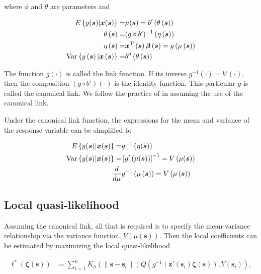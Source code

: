 \documentclass[12pt,english,authoryear, review]{article}\usepackage[]{graphicx}\usepackage[]{color}
\theoremstyle{plain}
\theoremstyle{plain}
\begin{document}
where $\phi$ and $\theta$ are parameters and

\begin{align*}
E\left\{ y(\bm{s})|\bm{x}(\bm{s})\right\} = & \mu(\bm{s})=b'\left(\theta\left(\bm{s}\right)\right)\\
\theta\left(\bm{s}\right)= & (g\circ b')^{-1}\left(\eta\left(\bm{s}\right)\right)\\
\eta\left(\bm{s}\right)= & \bm{x}^{T}\left(\bm{s}\right)\bm{\beta}\left(\bm{s}\right)=g\left(\mu\left(\bm{s}\right)\right)\\
\text{\text{Var}}\left\{ y\left(\bm{s}\right)|\bm{x}\left(\bm{s}\right)\right\} = & b''\left(\theta\left(\bm{s}\right)\right)
\end{align*}


The function $g(\cdot)$ is called the link function. If its inverse
$g^{-1}(\cdot)=b'(\cdot)$, then the composition $\left(g\circ b'\right)\left(\cdot\right)$
is the identity function. This particular $g$ is called the canonical
link. We follow the practice of \citet{Fan-Heckman-Wand-1995} in
assuming the use of the canonical link.

Under the canonical link function, the expressions for the mean and
variance of the response variable can be simplified to

\begin{align*}
E\left\{ y(\bm{s})|\bm{x}(\bm{s})\right\} = & g^{-1}\left(\eta(\bm{s})\right)\\
\text{\text{Var}}\left\{ y(\bm{s})|\bm{x}(\bm{s})\right\} = & \left[g'\left(\mu(\bm{s})\right)\right]^{-1}=V\left(\mu(\bm{s})\right)\\
\frac{d}{d\mu} & g^{-1}\left(\mu\left(\bm{s}\right)\right)=V\left(\mu\left(\bm{s}\right)\right)
\end{align*}
 


\subsection{Local quasi-likelihood}

Assuming the canonical link, all that is required is to specify the
mean-variance relationship via the variance function, $V\left(\mu\left(\bm{s}\right)\right)$.
Then the local coefficients can be estimated by maximizing the local
quasi-likelihood 

\begin{align}
\mathcal{\ell}^{*}\left(\bm{\zeta}(\bm{s})\right) & =\sum_{i=1}^{n}K_{h}\left(\|\bm{s}-\bm{s}_{i}\|\right)Q\left(g^{-1}\left(\bm{z}'(\bm{s}_{i})\bm{\zeta}(\bm{s})\right),Y(\bm{s}_{i})\right),
\end{align}
\end{document}
